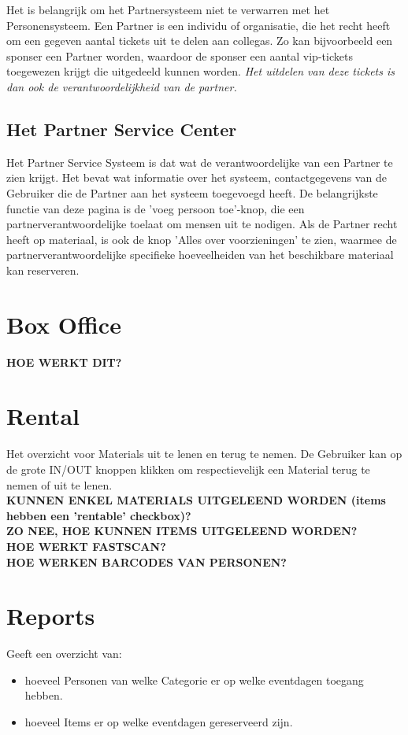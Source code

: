 \documentclass[]{memoir}
\begin{document}
Het is belangrijk om het Partnersysteem niet te verwarren met het Personensysteem. Een Partner is een individu of organisatie, die het recht heeft om een gegeven aantal tickets uit te delen aan collegas. Zo kan bijvoorbeeld een sponser een Partner worden, waardoor de sponser een aantal vip-tickets toegewezen krijgt die uitgedeeld kunnen worden. \textsl{Het uitdelen van deze tickets is dan ook de verantwoordelijkheid van de partner.}

\subsection{Het Partner Service Center} \label{PSC}
Het Partner Service Systeem is dat wat de verantwoordelijke van een Partner te zien krijgt. Het bevat wat informatie over het systeem, contactgegevens van de Gebruiker die de Partner aan het systeem toegevoegd heeft.
De belangrijkste functie van deze pagina is de 'voeg persoon toe'-knop, die een partnerverantwoordelijke toelaat om mensen uit te nodigen. Als de Partner recht heeft op materiaal, is ook de knop 'Alles over voorzieningen' te zien, waarmee de partnerverantwoordelijke specifieke hoeveelheiden van het beschikbare materiaal kan reserveren.

\section{Box Office} \label{Box Office}
\textbf{HOE WERKT DIT?}

\section{Rental} \label{Rental}
Het overzicht voor Materials uit te lenen en terug te nemen. De Gebruiker kan op de grote IN/OUT knoppen klikken om respectievelijk een Material terug te nemen of uit te lenen. \\
\textbf{KUNNEN ENKEL MATERIALS UITGELEEND WORDEN (items hebben een 'rentable' checkbox)?} \\
\textbf{ZO NEE, HOE KUNNEN ITEMS UITGELEEND WORDEN?} \\
\textbf{HOE WERKT FASTSCAN?} \\
\textbf{HOE WERKEN BARCODES VAN PERSONEN?} \\

\section{Reports} \label{Reports}
Geeft een overzicht van:
\begin{itemize}
	\item  hoeveel Personen van welke Categorie er op welke eventdagen toegang hebben.
	\item  hoeveel Items er op welke eventdagen gereserveerd zijn.
\end{itemize}
\end{document}
